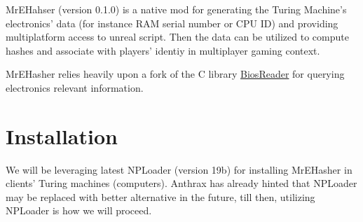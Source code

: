 \documentclass{article}
\theoremstyle{definition}
\newcommand{\MrEHasherVersion}{0.1.0}
\begin{document}
MrEHahser (version \MrEHasherVersion) is a native mod for generating the Turing Machine's electronics' data (for instance RAM serial number or CPU ID) and providing multiplatform access to unreal script.  Then the data can be utilized to compute hashes and associate with players' identiy in multiplayer gaming context. 

MrEHasher relies heavily upon a fork of the C library \href{https://github.com/ravimohan1991/BiosReader}{BiosReader} for querying electronics relevant information.

\section{Installation}
We will be leveraging latest NPLoader (version 19b) for installing MrEHasher in clients' Turing machines (computers).  Anthrax has already hinted that NPLoader may be replaced with better alternative in the future, till then, utilizing NPLoader is how we will proceed.
\end{document}
